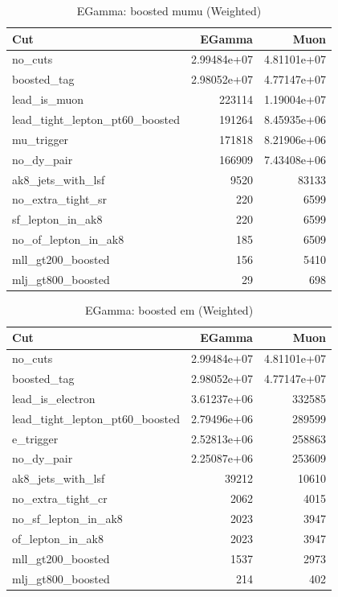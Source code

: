 \documentclass{article}
\begin{document}
\begin{table}[htbp]
\centering
\caption{EGamma: boosted mumu (Weighted)}
\begin{tabular}{lrr}
\hline
Cut & EGamma & Muon \\
\hline
no\_cuts & 2.99484e+07 & 4.81101e+07 \\
boosted\_tag & 2.98052e+07 & 4.77147e+07 \\
lead\_is\_muon & 223114 & 1.19004e+07 \\
lead\_tight\_lepton\_pt60\_boosted & 191264 & 8.45935e+06 \\
mu\_trigger & 171818 & 8.21906e+06 \\
no\_dy\_pair & 166909 & 7.43408e+06 \\
ak8\_jets\_with\_lsf & 9520 & 83133 \\
no\_extra\_tight\_sr & 220 & 6599 \\
sf\_lepton\_in\_ak8 & 220 & 6599 \\
no\_of\_lepton\_in\_ak8 & 185 & 6509 \\
mll\_gt200\_boosted & 156 & 5410 \\
mlj\_gt800\_boosted & 29 & 698 \\
\hline
\end{tabular}
\end{table}

\begin{table}[htbp]
\centering
\caption{EGamma: boosted em (Weighted)}
\begin{tabular}{lrr}
\hline
Cut & EGamma & Muon \\
\hline
no\_cuts & 2.99484e+07 & 4.81101e+07 \\
boosted\_tag & 2.98052e+07 & 4.77147e+07 \\
lead\_is\_electron & 3.61237e+06 & 332585 \\
lead\_tight\_lepton\_pt60\_boosted & 2.79496e+06 & 289599 \\
e\_trigger & 2.52813e+06 & 258863 \\
no\_dy\_pair & 2.25087e+06 & 253609 \\
ak8\_jets\_with\_lsf & 39212 & 10610 \\
no\_extra\_tight\_cr & 2062 & 4015 \\
no\_sf\_lepton\_in\_ak8 & 2023 & 3947 \\
of\_lepton\_in\_ak8 & 2023 & 3947 \\
mll\_gt200\_boosted & 1537 & 2973 \\
mlj\_gt800\_boosted & 214 & 402 \\
\hline
\end{tabular}
\end{table}
\end{document}

